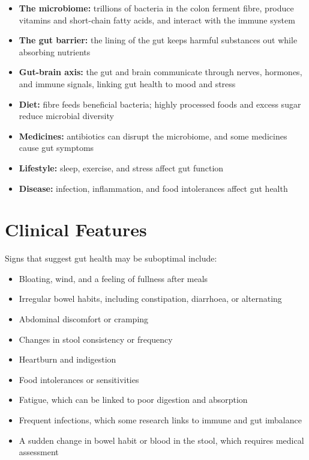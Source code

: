 \begin{itemize}
    \item \textbf{The microbiome:} trillions of bacteria in the colon ferment fibre, produce vitamins and short-chain fatty acids, and interact with the immune system
    \item \textbf{The gut barrier:} the lining of the gut keeps harmful substances out while absorbing nutrients
    \item \textbf{Gut-brain axis:} the gut and brain communicate through nerves, hormones, and immune signals, linking gut health to mood and stress
    \item \textbf{Diet:} fibre feeds beneficial bacteria; highly processed foods and excess sugar reduce microbial diversity
    \item \textbf{Medicines:} antibiotics can disrupt the microbiome, and some medicines cause gut symptoms
    \item \textbf{Lifestyle:} sleep, exercise, and stress affect gut function
    \item \textbf{Disease:} infection, inflammation, and food intolerances affect gut health
\end{itemize}

\section*{Clinical Features}
Signs that suggest gut health may be suboptimal include:

\begin{itemize}
    \item Bloating, wind, and a feeling of fullness after meals
    \item Irregular bowel habits, including constipation, diarrhoea, or alternating
    \item Abdominal discomfort or cramping
    \item Changes in stool consistency or frequency
    \item Heartburn and indigestion
    \item Food intolerances or sensitivities
    \item Fatigue, which can be linked to poor digestion and absorption
    \item Frequent infections, which some research links to immune and gut imbalance
    \item A sudden change in bowel habit or blood in the stool, which requires medical assessment
\end{itemize}

